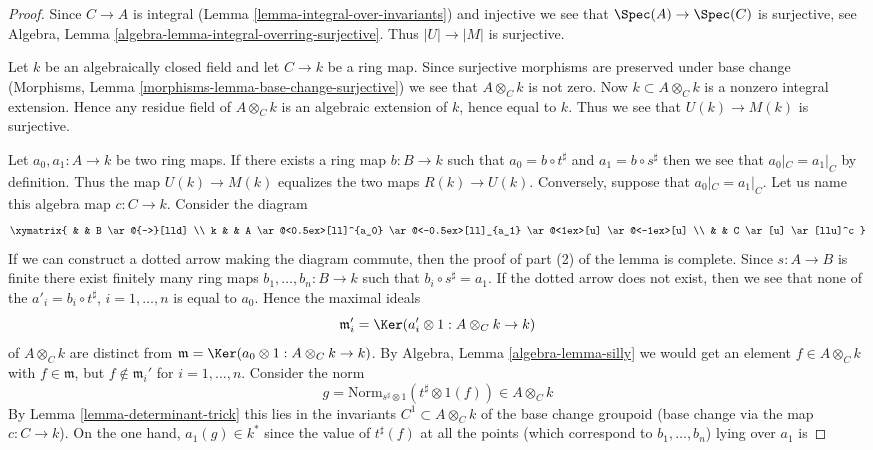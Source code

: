 \begin{proof}
Since $C \to A$ is integral (Lemma \ref{lemma-integral-over-invariants})
and injective we see that $\Spec(A) \to \Spec(C)$ is surjective, see
Algebra, Lemma \ref{algebra-lemma-integral-overring-surjective}.
Thus $|U| \to |M|$ is surjective.

\medskip\noindent
Let $k$ be an algebraically closed field and let $C \to k$ be a ring map.
Since surjective morphisms are preserved under base change
(Morphisms, Lemma \ref{morphisms-lemma-base-change-surjective})
we see that $A \otimes_C k$ is not zero. Now $k \subset A \otimes_C k$ is a
nonzero integral extension. Hence any residue field of $A \otimes_C k$
is an algebraic extension of $k$, hence equal to $k$. Thus we see that
$U(k) \to M(k)$ is surjective.

\medskip\noindent
Let $a_0, a_1 : A \to k$ be two ring maps. If there exists a ring map
$b : B \to k$ such that $a_0 = b \circ t^\sharp$ and $a_1 = b \circ s^\sharp$
then we see that $a_0|_C = a_1|_C$ by definition. Thus the map
$U(k) \to M(k)$ equalizes the two maps $R(k) \to U(k)$.
Conversely, suppose that $a_0|_C = a_1|_C$. Let us name this algebra
map $c : C \to k$. Consider the diagram
$$
\xymatrix{
& &
B \ar@{-->}[lld] \\
k & &
A
\ar@<0.5ex>[ll]^{a_0}
\ar@<-0.5ex>[ll]_{a_1}
\ar@<1ex>[u]
\ar@<-1ex>[u] \\
& &
C \ar[u] \ar[llu]^c
}
$$
If we can construct a dotted arrow making the diagram commute, then
the proof of part (2) of the lemma is complete. Since $s : A \to B$ is finite
there exist finitely many ring maps
$b_1, \ldots, b_n : B \to k$ such that $b_i \circ s^\sharp = a_1$.
If the dotted arrow does not exist, then we see that none of the
$a'_i = b_i \circ t^\sharp$, $i = 1, \ldots, n$ is equal to $a_0$.
Hence the maximal ideals
$$
\mathfrak m'_i = \Ker(a_i' \otimes 1 : A \otimes_C k \to k)
$$
of $A \otimes_C k$ are distinct from
$\mathfrak m = \Ker(a_0 \otimes 1 : A \otimes_C k \to k)$.
By Algebra, Lemma \ref{algebra-lemma-silly} we would get an element
$f \in A \otimes_C k$ with $f \in \mathfrak m$, but
$f \not \in \mathfrak m_i'$ for $i = 1, \ldots, n$.
Consider the norm
$$
g = \text{Norm}_{s^\sharp \otimes 1}(t^\sharp \otimes 1(f))
\in
A \otimes_C k
$$
By Lemma \ref{lemma-determinant-trick} this lies in the invariants
$C^1 \subset A \otimes_C k$ of the base change
groupoid (base change via the map $c : C \to k$). On the one hand,
$a_1(g) \in k^*$ since
the value of $t^\sharp(f)$ at all the points (which correspond to
$b_1, \ldots, b_n$) lying over $a_1$ is

\end{proof}
